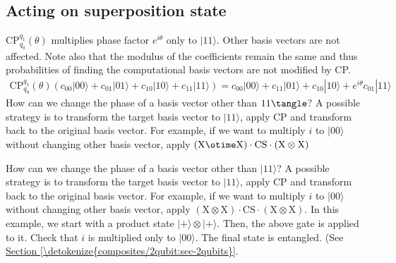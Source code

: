 \documentclass[letterpaper,10pt,english]{jupyterBook}
\begin{document}
\subsection{Acting on superposition state}
\label{\detokenize{q2gates/cp:acting-on-superposition-state}}
\sphinxAtStartPar
CP\(_{q_0}^{q_1}(\theta)\) multiplies phase factor \(e^{i\theta}\) only to \(|11\rangle\).  Other basis vectors are not affected.  Note also that the modulus of the coefficients remain the same and thus probabilities of finding the computational basis vectors are not modified by CP.
\begin{equation*}
\begin{split}
\text{CP}_{q_0}^{q_1} (\theta) \left (c_{00} |00\rangle + c_{01} |01\rangle + c_{10} |10\rangle + c_{11} |11\rangle \right ) =
c_{00} |00\rangle + c_{11} |01\rangle + c_{10} |10\rangle + e^{i \theta} c_{01} |11\rangle
\end{split}
\end{equation*}
\sphinxAtStartPar
How can we change the phase of a basis vector other than \(11\tangle\)?  A possible strategy is to transform the target basis vector to \(|11\rangle\), apply CP and transform back to the original basis vector.  For example, if we want to multiply \(i\) to \(|00\rangle\) without changing other basis vector, apply \((\text{X} \otime \text{X}) \cdot \text{CS} \cdot (\text{X} \otimes \text{X})\)

\sphinxAtStartPar
{}How can we change the phase of a basis vector other than \(|11\rangle\)?  A possible strategy is to transform the target basis vector to \(|11\rangle\), apply CP and transform back to the original basis vector.  For example, if we want to multiply \(i\) to \(|00\rangle\) without changing other basis vector, apply \((\text{X} \otimes \text{X}) \cdot \text{CS} \cdot (\text{X} \otimes \text{X})\).  In this example, we start with a product state \(|+\rangle \otimes |+\rangle\).  Then, the above gate is applied to it.  Check that \(i\) is multiplied only to  \(|00\rangle\).  The final state is entangled. (See \hyperref[\detokenize{composites/2qubit:sec-2qubits}]{Section \ref{\detokenize{composites/2qubit:sec-2qubits}}}.
\end{document}
